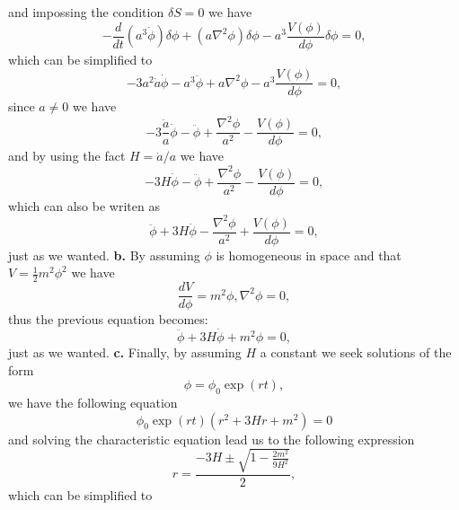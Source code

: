 \documentclass[11pt]{article}
\begin{document}
\begin{problem}
\begin{displaymath}
\end{displaymath}
and impossing the condition $\delta S=0$ we have
\begin{displaymath}
  -\frac{d}{dt}\left(a^3\dot\phi\right)\delta\phi + (a\nabla^2\phi)\delta\phi - a^3 \frac{V(\phi)}{d\phi}\delta\phi = 0,
\end{displaymath}
which can be simplified to 
\begin{displaymath}
  -3a^2\dot a\dot\phi  - a^3\ddot\phi + a\nabla^2\phi - a^3 \frac{V(\phi)}{d\phi}=0,
\end{displaymath}
since $a\neq 0$ we have
\begin{displaymath}
 -3\frac{\dot a}{a}\dot\phi  - \ddot\phi + \frac{\nabla^2\phi}{a^2} -\frac{V(\phi)}{d\phi}=0,
\end{displaymath}
and by using the fact $H = \dot a /a$ we have
\begin{displaymath}
-3H\dot\phi  - \ddot\phi + \frac{\nabla^2\phi}{a^2} -\frac{V(\phi)}{d\phi}=0, 
\end{displaymath}
which can also be writen as
\begin{displaymath}
\ddot\phi + 3H\dot\phi- \frac{\nabla^2\phi}{a^2} + \frac{V(\phi)}{d\phi}=0,
\end{displaymath}
just as we wanted.
\newline
\textbf{b.} By assuming $\phi$ is homogeneous in space and that $V=\frac{1}{2}m^2\phi^2$ we have
\begin{displaymath}
  \frac{dV}{d\phi} = m^2\phi, \nabla^2\phi = 0,
\end{displaymath}
thus the previous equation becomes:
\begin{displaymath}
\ddot\phi + 3H\dot\phi + m^2\phi=0,  
\end{displaymath}
just as we wanted.
\newline
\textbf{c.} Finally, by assuming $H$ a constant we seek solutions of the form 
\begin{displaymath}
  \phi = \phi_0\exp(rt),
\end{displaymath}
we have the following equation
\begin{displaymath}
\phi_0\exp(rt)\left(r^2 +3Hr+m^2\right)=0
\end{displaymath}
and solving the characteristic equation lead us to the following expression
\begin{displaymath}
  r = \frac{-3H\pm \sqrt{1-\frac{2m^2}{9H^2}}}{2},
\end{displaymath}
which can be simplified to 
\begin{displaymath}

\end{displaymath}
\end{problem}
\end{document}
